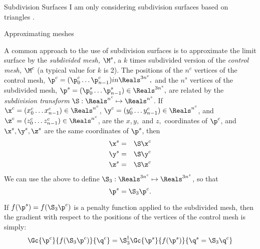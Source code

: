 \begin{plSection}{Subdivision Surfaces}
I am only considering subdivision surfaces based on triangles
\cite{HoppeEtal:1994:SIGGRAPH,Hoppe:1994:Phd}.
\begin{plSection}{Approximating meshes}
\label{sec:Approximating-meshes}

A common approach to the use of subdivision surfaces is
to approximate the limit surface by the {\it subdivided mesh,} $\M^s$,
a $k$ times subdivided version of the {\it control mesh,} $\M^c$
(a typical value for $k$ is 2).
The positions of the $n^c$ vertices of the control mesh,
$\p^c = (\p^c_0 \ldots \p^c_{n-1}) \\in \Reals^{3n^c},$
and the $n^s$ vertices of the subdivided mesh,
$\p^s = (\p^s_0 \ldots \p^s_{n-1}) \in \Reals^{3n^s},$
are related by the {\it subdivision transform}
$\S : \Reals^{n^c} \mapsto \Reals^{n^s}$.
If
$\x^c = (x^c_0 \ldots x^c_{n-1}) \in \Reals^{n^c}$,
$\y^c = (y^c_0 \ldots y^c_{n-1}) \in \Reals^{n^c}$,
and
$\z^c = (z^c_0 \ldots z^c_{n-1}) \in \Reals^{n^c}$,
are the $x, y,$ and $z,$ coordinates of $\p^c$,
and $\x^s, \y^s, \z^s$ are the same coordinates
of $\p^s$, then
\begin{eqnarray}
\x^s & = & \S \x^c
\\
\y^s & = & \S \y^c
\nonumber
\\
\z^s & = & \S \z^c
\nonumber
\end{eqnarray}
We can use the above to define $\S_3 : \Reals^{3n^c} \mapsto \Reals^{3n^s}$,
so that
\begin{equation}
\p^s = \S_3 \p^c.
\end{equation}


If $f(\p^s) = f(\S_3 \p^c)$ is a penalty function applied to the subdivided mesh,
then the gradient with respect to the positions of
the vertices of the control mesh is simply:
\begin{equation}
\Gc{\p^c}{f(\S_3 \p^c)}{\q^c} = \S_3^{\dagger} \Gc{\p^s}{f(\p^s)}{\q^s = \S_3 \q^c}
\end{equation}

\end{plSection}%
\end{plSection}%
